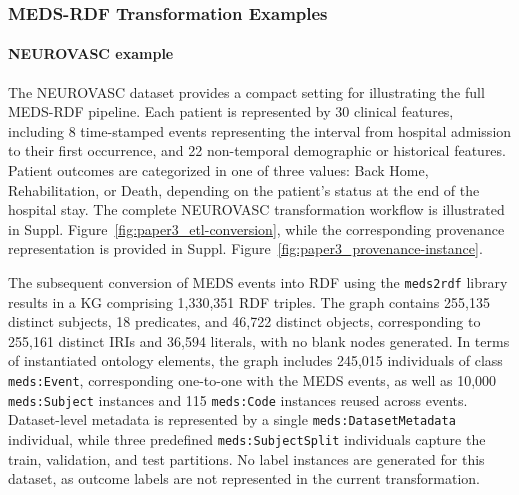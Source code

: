\subsubsection{MEDS-RDF Transformation Examples}
\label{sec:paper3_supp-transformation-examples}

\paragraph{NEUROVASC example}
The NEUROVASC dataset provides a compact setting for illustrating the full MEDS-RDF pipeline. Each patient is represented by 30 clinical features, including 8 time-stamped events representing the interval from hospital admission to their first occurrence, and 22 non-temporal demographic or historical features. Patient outcomes are categorized in one of three values: Back Home, Rehabilitation, or Death, depending on the patient's status at the end of the hospital stay. %
The complete NEUROVASC transformation workflow is illustrated in Suppl. Figure~\ref{fig:paper3_etl-conversion}, while the corresponding provenance representation is provided in Suppl. Figure~\ref{fig:paper3_provenance-instance}.

The subsequent conversion of MEDS events into RDF using the \texttt{meds2rdf} library results in a KG comprising 1,330,351 RDF triples. The graph contains 255,135 distinct subjects, 18 predicates, and 46,722 distinct objects, corresponding to 255,161 distinct IRIs and 36,594 literals, with no blank nodes generated. In terms of instantiated ontology elements, the graph includes 245,015 individuals of class \texttt{meds:Event}, corresponding one-to-one with the MEDS events, as well as 10,000 \texttt{meds:Subject} instances and 115 \texttt{meds:Code} instances reused across events. Dataset-level metadata is represented by a single \texttt{meds:DatasetMetadata} individual, while three predefined \texttt{meds:SubjectSplit} individuals capture the train, validation, and test partitions. No label instances are generated for this dataset, as outcome labels are not represented in the current transformation.

